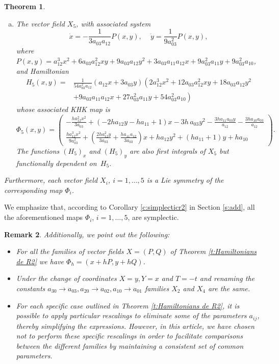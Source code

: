 \documentclass[11pt]{article}
\newtheorem {theorem} {Theorem}%
\newtheorem {remark} [theorem]{Remark}
\begin{document}
\begin{theorem}
\begin{enumerate}[(a)]
    \smallskip
\item The vector field $X_5$, with associated system
    $$
\dot{x}=-\frac{1}{3 a_{03} a_{12}}P(x,y),\, \quad
\dot{y}=\frac{1}{9 a_{03}^{2}}P(x,y),
    $$where $P(x,y)=a_{12}^{3}x^{2} +6 a_{03} a_{12}^{2}x y +9 a_{03}  a_{12}y^{2}+3  a_{03} a_{11} a_{12}x+9  a_{03}^{2} a_{11}y+9 a_{03}^{2} a_{10}$,
    and Hamiltonian \begin{align*}
    H_5(x,y)=&\frac{1}{54 a_{03}^{2} a_{12}}\left(a_{12} x +3  a_{03}y\right)\left(2  a_{12}^{3}x^{2}+12  a_{03} a_{12}^{2}x y+18 a_{03}  a_{12}y^{2}\right.\\
&\left.+9  a_{03} a_{11} a_{12}x+27  a_{03}^{2} a_{11}y+54 a_{03}^{2} a_{10}\right)
\end{align*}
whose associated KHK map is
$$
\Phi_5(x,y)=\left(\begin{array}{c}
-\frac{h a_{12}^{2} x^{2}}{3 a_{03}}+\left(-2 h  a_{12}y-h a_{11}+1\right) x -3 h \,a_{03} y^{2}-
\frac{3 h a_{11} a_{03} y}{a_{12}}-\frac{3 h a_{10} a_{03}}{a_{12}}
\\
 \frac{h a_{12}^{3} x^{2}}{9 a_{03}^{2}}+\left(\frac{2 h a_{12}^{2} y}{3 a_{03}}+\frac{h a_{11} a_{12}}{3 a_{03}}\right) x +h a_{12} y^{2}+\left(h a_{11}+1\right) y +
h a_{10}
\end{array}\right).
$$
The functions $(H_{5})_{x}$ and $(H_{5})_{y}$ are also first integrals of $X_5$ but functionally dependent on~$H_5$.
\end{enumerate}
Furthermore, each vector field $X_i$, $i=1,\ldots,5$ is a Lie symmetry of the corresponding map $\Phi_i$.

\end{theorem}

We emphasize that, according to Corollary \ref{c:simplecticr2} in Section \ref{s:add}, all the aforementioned maps $\Phi_i$, $i=1,\ldots,5$, are symplectic. 


\begin{remark} Additionally, we point out the following:
\begin{itemize}
\item[(a)] For all the families of vector fields $X=(P,Q)$ of  Theorem \ref{t:Hamiltonians de R2} we have $\Phi_h=(x+hP,y+hQ)$.
\item[(b)] Under the change of coordinates $X=y, Y=x$ and $T= -t$ and renaming the constants $a_{30}\rightarrow a_{03}, a_{20}\rightarrow a_{02}, a_{10}\rightarrow a_{01}$ families $X_2$ and $X_4$ are the same.
\item[(c)] For each specific case outlined in Theorem \ref{t:Hamiltonians de R2}, it is possible to apply particular rescalings to eliminate some of the parameters $a_{ij}$, thereby simplifying the expressions. However, in this article, we have chosen not to perform these specific rescalings in order to facilitate comparisons between the different families by maintaining a consistent set of common parameters.

\end{itemize}


\end{remark}
\end{document}
